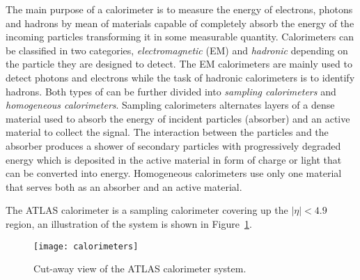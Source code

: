 The main purpose of a calorimeter is to measure the energy of electrons, photons
and hadrons by mean of materials capable of completely absorb the energy of the
incoming particles transforming it in some measurable quantity. Calorimeters can
be classified in two categories, \emph{electromagnetic} (EM) and \emph{hadronic}
depending on the particle they are designed to detect. The EM calorimeters are
mainly used to detect photons and electrons while the task of hadronic
calorimeters is to identify hadrons. Both types of can be further divided into
\emph{sampling calorimeters} and \emph{homogeneous calorimeters}. Sampling
calorimeters alternates layers of a dense material used to absorb the energy of
incident particles (absorber) and an active material to collect the signal. The
interaction between the particles and the absorber produces a shower of
secondary particles with progressively degraded energy which is deposited in the
active material in form of charge or light that can be converted into
energy. Homogeneous calorimeters use only one material that serves both as an
absorber and an active material\cite{Calorimetry}.

The ATLAS calorimeter is a sampling calorimeter covering up the $|\eta| < 4.9$
region, an illustration of the system is shown in Figure~\ref{fig:calo}.
\begin{figure}[!h]
  \centering
    \texttt{[image: calorimeters]}
    \caption{Cut-away view of the ATLAS calorimeter system.}
    \label{fig:calo}
\end{figure}
